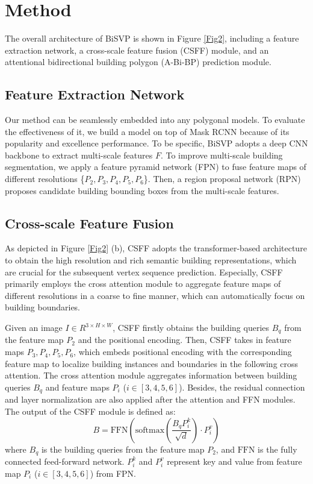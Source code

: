 \documentclass{article}
\begin{document}
\section{Method}
\label{sec:pagestyle}

The overall architecture of BiSVP is shown in Figure \ref{Fig2}, including a feature extraction network, a cross-scale feature fusion (CSFF) module, and an attentional bidirectional building polygon (A-Bi-BP) prediction module.
\vspace{-10pt}
\subsection{Feature Extraction Network}
Our method can be seamlessly embedded into any polygonal models. To evaluate the effectiveness of it, we build a model on top of Mask RCNN because of its popularity and excellence performance. To be specific, BiSVP adopts a deep CNN backbone to extract multi-scale features $\textit{F}$. To improve multi-scale building segmentation, we apply a feature pyramid network (FPN) \cite{lin2017fpn} to fuse feature maps of different resolutions \{$\textit{P}_2, \textit{P}_3, \textit{P}_4, \textit{P}_5, \textit{P}_6$\}. Then, a region proposal network (RPN) \cite{ren2015fasterrcnn} proposes candidate building bounding boxes from the multi-scale features.
\vspace{-10pt}
\subsection{Cross-scale Feature Fusion}
As depicted in Figure \ref{Fig2} (b), CSFF adopts the transformer-based architecture to obtain the high resolution and rich semantic building representations, which are crucial for the subsequent vertex sequence prediction. Especially, CSFF primarily employs the cross attention module to aggregate feature maps of different resolutions in a coarse to fine manner, which can automatically focus on building boundaries.

Given an image $\textit{I}\in R^{3 \times H \times W}$, CSFF firstly obtains the building queries $\textit{B}_{q}$ from the feature map $\textit{P}_2$ and the positional encoding. Then, CSFF takes in feature maps ${\textit{P}_3, \textit{P}_4, \textit{P}_5, \textit{P}_6}$, which embeds positional encoding with the corresponding feature map to localize building instances and boundaries in the following cross attention. The cross attention module aggregates information between building queries $\textit{B}_{q}$ and feature maps $\textit{P}_i$ ($i \in [3,4,5,6]$). Besides, the residual connection and layer normalization are also applied after the attention and FFN modules. The output of the CSFF module is defined as:
\begin{equation} \label{eqn1}
  B = \text{FFN}(\text{softmax}(\frac{B_{q}P_i^{k}}{\sqrt{d}})\cdot{P_i^{v}})
\end{equation}
where $B_{q}$ is the building queries from the feature map $\textit{P}_2$, and $\text{FFN}$ is the fully connected feed-forward network. $P_i^{k}$ and $P_i^{v}$ represent key and value from feature map $P_i$ ($i \in [3,4,5,6]$) from FPN.
\vspace{-10pt}
\end{document}
